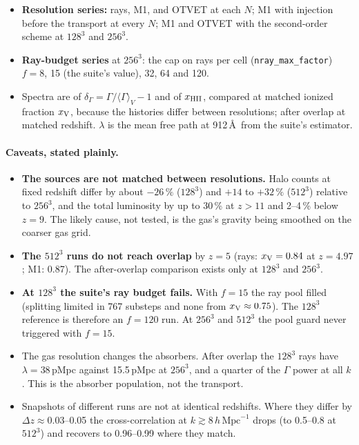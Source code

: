 \documentclass[11pt]{article}
\newcommand{\hmpc}{\,h\,\mathrm{Mpc}^{-1}}
\newcommand{\xv}{x_{\rm V}}
\begin{document}
\begin{itemize}
\item \textbf{Resolution series:} rays, M1, and OTVET at each $N$; M1 with injection before the transport
at every $N$; M1 and OTVET with the second-order scheme at $128^3$ and $256^3$.
\item \textbf{Ray-budget series} at $256^3$: the cap on rays per cell (\texttt{nray\_max\_factor}) $f=8$, 15
(the suite's value), 32, 64 and 120.
\item Spectra are of $\delta_\Gamma=\Gamma/\langle\Gamma\rangle_V-1$ and of $x_{\rm HII}$, compared at
matched ionized fraction $\xv$, because the histories differ between resolutions; after overlap at matched
redshift. $\lambda$ is the mean free path at 912\,\AA\ from the suite's estimator.
\end{itemize}

\paragraph{Caveats, stated plainly.}
\begin{itemize}
\item \textbf{The sources are not matched between resolutions.} Halo counts at fixed redshift differ by about
$-26\,\%$ ($128^3$) and $+14$ to $+32\,\%$ ($512^3$) relative to $256^3$, and the total luminosity by up to
30\,\% at $z>11$ and 2--4\,\% below $z=9$. The likely cause, not tested, is the gas's gravity being smoothed on the
coarser gas grid.
\item \textbf{The $512^3$ runs do not reach overlap} by $z=5$ (rays: $\xv=0.84$ at $z=4.97$; M1: 0.87). The
after-overlap comparison exists only at $128^3$ and $256^3$.
\item \textbf{At $128^3$ the suite's ray budget fails.} With $f=15$ the ray pool filled (splitting limited
in 767 substeps and none from $\xv\approx0.75$). The $128^3$ reference is therefore an $f=120$ run. At
$256^3$ and $512^3$ the pool guard never triggered with $f=15$.
\item The gas resolution changes the absorbers. After overlap the $128^3$ rays have $\lambda=38$\,pMpc
against 15.5\,pMpc at $256^3$, and a quarter of the $\Gamma$ power at all $k$. This is the absorber
population, not the transport.
\item Snapshots of different runs are not at identical redshifts. Where they differ by $\Delta z\approx0.03$--0.05
the cross-correlation at $k\gtrsim8\hmpc$ drops (to 0.5--0.8 at $512^3$) and recovers to 0.96--0.99 where they
match.
\end{itemize}
\end{document}
